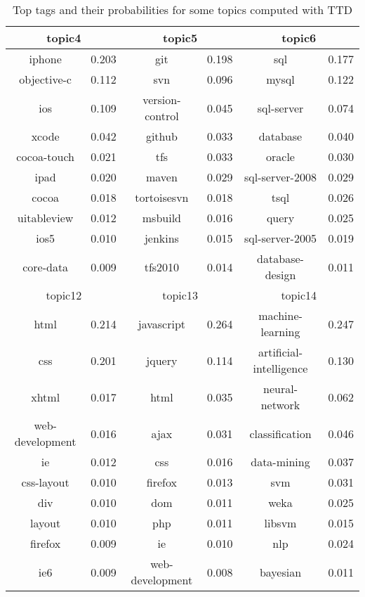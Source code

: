 \begin{table}[htp]
\caption{Top tags and their probabilities for some topics computed with TTD}
\label{tab:toptagspttd}
\centering
\begin{tabular}{|c|c|c|c|c|c|}

\hline
\multicolumn{2}{|c|}{topic4} & \multicolumn{2}{c|}{topic5} & \multicolumn{2}{c|}{topic6}  \\
\hline
iphone&0.203&git&0.198&sql&0.177\\
\hline
objective-c&0.112&svn&0.096&mysql&0.122\\
\hline
ios&0.109&version-control&0.045&sql-server&0.074\\
\hline
xcode&0.042&github&0.033&database&0.040\\
\hline
cocoa-touch&0.021&tfs&0.033&oracle&0.030\\
\hline
ipad&0.020&maven&0.029&sql-server-2008&0.029\\
\hline
cocoa&0.018&tortoisesvn&0.018&tsql&0.026\\
\hline
uitableview&0.012&msbuild&0.016&query&0.025\\
\hline
ios5&0.010&jenkins&0.015&sql-server-2005&0.019\\
\hline
core-data&0.009&tfs2010&0.014&database-design&0.011\\
\hline
\hline
\multicolumn{2}{|c|}{topic12} & \multicolumn{2}{c|}{topic13} & \multicolumn{2}{c|}{topic14}   \\
\hline
html&0.214&javascript&0.264&machine-learning&0.247\\
\hline
css&0.201&jquery&0.114&artificial-intelligence&0.130\\
\hline
xhtml&0.017&html&0.035&neural-network&0.062\\
\hline
web-development&0.016&ajax&0.031&classification&0.046\\
\hline
ie&0.012&css&0.016&data-mining&0.037\\
\hline
css-layout&0.010&firefox&0.013&svm&0.031\\
\hline
div&0.010&dom&0.011&weka&0.025\\
\hline
layout&0.010&php&0.011&libsvm&0.015\\
\hline
firefox&0.009&ie&0.010&nlp&0.024\\
\hline
ie6&0.009&web-development&0.008&bayesian&0.011\\
\hline
\end{tabular}
\end{table}


